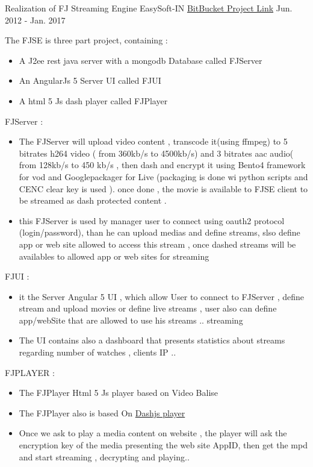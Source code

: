 \begin{cventries}

\cventry
{Realization of FJ Streaming Engine} %
{ EasySoft-IN } %
{ \href{https://bitbucket.org/account/user/easysoftin/projects/FJSE}{BitBucket Project Link} }%
{Jun. 2012 - Jan. 2017}  %
{ %
\begin{cvitems}
\item {The FJSE is three part project, containing :}
\begin{itemize}
\item { A J2ee rest java server  with a mongodb Database called FJServer}
\item { An AngularJs 5 Server UI called FJUI }
\item { A  html 5 Js dash player called FJPlayer}
\end{itemize}
\item {  FJServer : }
\begin{itemize}
\item{ The FJServer will upload video content ,  transcode it(using ffmpeg) to 5 bitrates h264 video ( from 360kb/s to 4500kb/s) and 3 bitrates aac audio( from 128kb/s to 450 kb/s , then dash and encrypt it using Bento4 framework for vod and Googlepackager for Live (packaging is done wi python scripts and CENC clear key  is used ). once done , the movie is available to FJSE client to be streamed as dash protected content . }
\item {this FJServer is used by manager user to connect using oauth2 protocol (login/password), than he can upload medias and define streams, slso define app or web site allowed to access this stream , once dashed streams will be availables to allowed app or web sites for streaming}
\end{itemize}
\item {FJUI :}
\begin{itemize}
\item {it the Server Angular 5 UI , which allow User  to connect to FJServer , define stream and upload movies or define live streams  , user also can define app/webSite that are allowed to use his streams ..
 streaming}
\item {The UI contains also a dashboard that presents statistics about streams regarding number of watches , clients IP ..}
\end{itemize}
\item { FJPLAYER :}
\begin{itemize}
\item {The FJPlayer Html 5 Js player based on Video Balise }
\item {The FJPlayer also is based On \href{http://dashif.org/reference/players/javascript/1.4.0/samples/dash-if-reference-player/}{Dashjs player} }
\item {Once we ask to play a media content on website , the player will ask the encryption key of the media presenting the web site AppID, then get the mpd and start streaming , decrypting  and playing..}
\end{itemize}
\end{cvitems}
}


\end{cventries}
